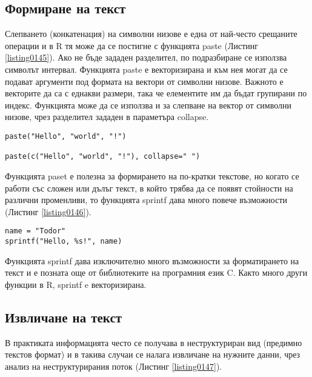 \subsection{Формиране на текст}

Слепването (конкатенация) на символни низове е една от най-често срещаните операции и в R тя може да се постигне с функцията paste (Листинг \ref{listing0145}). Ако не бъде зададен разделител, по подразбиране се използва символът интервал. Функцията paste е векторизирана и към нея могат да се подават аргументи под формата на вектори от символни низове. Важното е векторите да са с еднакви размери, така че елементите им да бъдат групирани по индекс. Функцията може да се използва и за слепване на вектор от символни низове, чрез разделител зададен в параметъра collapse.

\begin{lstlisting}[caption=Конкатенация на символни низове, label=listing0145]
paste("Hello", "world", "!")

paste(c("Hello", "world", "!"), collapse=" ")
\end{lstlisting}

Функцията paset е полезна за формирането на по-кратки текстове, но когато се работи със сложен или дълъг текст, в който трябва да се появят стойности на различни променливи, то функцията sprintf дава много повече възможности (Листинг \ref{listing0146}).

\begin{lstlisting}[caption=Разпъване от редове в колони, label=listing0146]
name = "Todor"
sprintf("Hello, %s!", name)
\end{lstlisting}

Функцията sprintf дава изключително много възможности за форматирането на текст и е позната още от библиотеките на програмния език C. Както много други функции в R, sprintf e векторизирана.

\subsection{Извличане на текст}

В практиката информацията често се получава в неструктуриран вид (предимно текстов формат) и в такива случаи се налага извличане на нужните данни, чрез анализ на неструктурирания поток (Листинг \ref{listing0147}).

